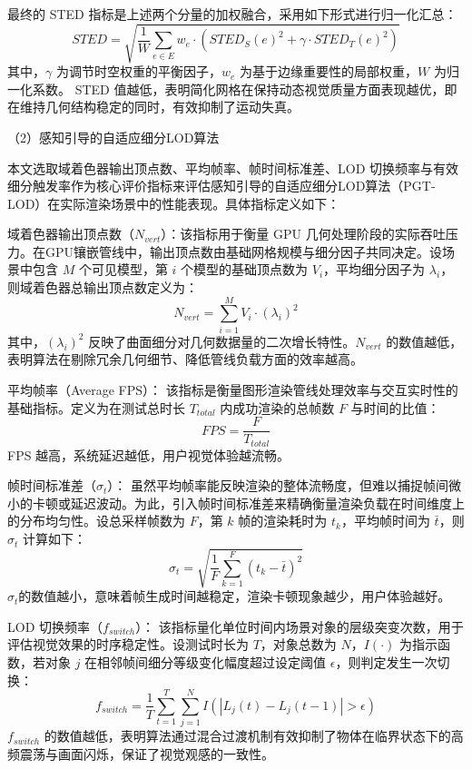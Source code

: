 最终的 STED 指标是上述两个分量的加权融合，采用如下形式进行归一化汇总：
\begin{equation}
STED = \sqrt{ \frac{1}{W} \sum_{e \in E} w_e \cdot \left( STED_S(e)^2 + \gamma \cdot STED_T(e)^2 \right) }
\end{equation}
其中，$\gamma$ 为调节时空权重的平衡因子，$w_e$ 为基于边缘重要性的局部权重，$W$ 为归一化系数。
STED 值越低，表明简化网格在保持动态视觉质量方面表现越优，即在维持几何结构稳定的同时，有效抑制了运动失真。


（2）感知引导的自适应细分LOD算法

本文选取域着色器输出顶点数、平均帧率、帧时间标准差、LOD 切换频率与有效细分触发率作为核心评价指标来评估感知引导的自适应细分LOD算法（PGT-LOD）在实际渲染场景中的性能表现。具体指标定义如下：

域着色器输出顶点数（$N_{vert}$）：该指标用于衡量 GPU 几何处理阶段的实际吞吐压力。在GPU镶嵌管线中，输出顶点数由基础网格规模与细分因子共同决定。设场景中包含 $M$ 个可见模型，第 $i$ 个模型的基础顶点数为 $V_i$，平均细分因子为 $\lambda_i$，则域着色器总输出顶点数定义为：
\begin{equation}
N_{vert} = \sum_{i=1}^{M} V_i \cdot (\lambda_i)^2
\end{equation}
其中，$(\lambda_i)^2$ 反映了曲面细分对几何数据量的二次增长特性。$N_{vert}$ 的数值越低，表明算法在剔除冗余几何细节、降低管线负载方面的效率越高。


平均帧率（Average FPS）：
该指标是衡量图形渲染管线处理效率与交互实时性的基础指标。定义为在测试总时长 $T_{total}$ 内成功渲染的总帧数 $F$ 与时间的比值：
\begin{equation}
FPS = \frac{F}{T_{total}}
\end{equation}
FPS 越高，系统延迟越低，用户视觉体验越流畅。

帧时间标准差（$\sigma_t$）：
虽然平均帧率能反映渲染的整体流畅度，但难以捕捉帧间微小的卡顿或延迟波动。为此，引入帧时间标准差来精确衡量渲染负载在时间维度上的分布均匀性。设总采样帧数为 $F$，第 $k$ 帧的渲染耗时为 $t_k$，平均帧时间为 $\bar{t}$，则 $\sigma_t$ 计算如下：
\begin{equation}
\sigma_t = \sqrt{\frac{1}{F} \sum_{k=1}^{F} (t_k - \bar{t})^2}
\end{equation}
$\sigma_t$的数值越小，意味着帧生成时间越稳定，渲染卡顿现象越少，用户体验越好。

LOD 切换频率（$f_{switch}$）：
该指标量化单位时间内场景对象的层级突变次数，用于评估视觉效果的时序稳定性。设测试时长为 $T$，对象总数为 $N$，$I(\cdot)$ 为指示函数，若对象 $j$ 在相邻帧间细分等级变化幅度超过设定阈值 $\epsilon$，则判定发生一次切换：
\begin{equation} 
f_{switch} = \frac{1}{T} \sum_{t=1}^{T} \sum_{j=1}^{N} I\left( |L_j(t) - L_j(t-1)| > \epsilon \right) 
\end{equation}
$f_{switch}$ 的数值越低，表明算法通过混合过渡机制有效抑制了物体在临界状态下的高频震荡与画面闪烁，保证了视觉观感的一致性。

